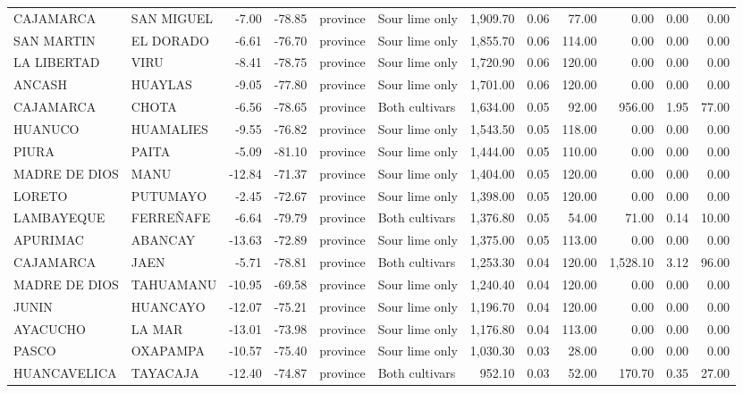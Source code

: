 \begin{longtable}{llrrllrrrrrr}
CAJAMARCA & SAN MIGUEL & -7.00 & -78.85 & province & Sour lime only & 1,909.70 & 0.06 & 77.00 & 0.00 & 0.00 & 0.00 \\
SAN MARTIN & EL DORADO & -6.61 & -76.70 & province & Sour lime only & 1,855.70 & 0.06 & 114.00 & 0.00 & 0.00 & 0.00 \\
LA LIBERTAD & VIRU & -8.41 & -78.75 & province & Sour lime only & 1,720.90 & 0.06 & 120.00 & 0.00 & 0.00 & 0.00 \\
ANCASH & HUAYLAS & -9.05 & -77.80 & province & Sour lime only & 1,701.00 & 0.06 & 120.00 & 0.00 & 0.00 & 0.00 \\
CAJAMARCA & CHOTA & -6.56 & -78.65 & province & Both cultivars & 1,634.00 & 0.05 & 92.00 & 956.00 & 1.95 & 77.00 \\
HUANUCO & HUAMALIES & -9.55 & -76.82 & province & Sour lime only & 1,543.50 & 0.05 & 118.00 & 0.00 & 0.00 & 0.00 \\
PIURA & PAITA & -5.09 & -81.10 & province & Sour lime only & 1,444.00 & 0.05 & 110.00 & 0.00 & 0.00 & 0.00 \\
MADRE DE DIOS & MANU & -12.84 & -71.37 & province & Sour lime only & 1,404.00 & 0.05 & 120.00 & 0.00 & 0.00 & 0.00 \\
LORETO & PUTUMAYO & -2.45 & -72.67 & province & Sour lime only & 1,398.00 & 0.05 & 120.00 & 0.00 & 0.00 & 0.00 \\
LAMBAYEQUE & FERREÑAFE & -6.64 & -79.79 & province & Both cultivars & 1,376.80 & 0.05 & 54.00 & 71.00 & 0.14 & 10.00 \\
APURIMAC & ABANCAY & -13.63 & -72.89 & province & Sour lime only & 1,375.00 & 0.05 & 113.00 & 0.00 & 0.00 & 0.00 \\
CAJAMARCA & JAEN & -5.71 & -78.81 & province & Both cultivars & 1,253.30 & 0.04 & 120.00 & 1,528.10 & 3.12 & 96.00 \\
MADRE DE DIOS & TAHUAMANU & -10.95 & -69.58 & province & Sour lime only & 1,240.40 & 0.04 & 120.00 & 0.00 & 0.00 & 0.00 \\
JUNIN & HUANCAYO & -12.07 & -75.21 & province & Sour lime only & 1,196.70 & 0.04 & 120.00 & 0.00 & 0.00 & 0.00 \\
AYACUCHO & LA MAR & -13.01 & -73.98 & province & Sour lime only & 1,176.80 & 0.04 & 113.00 & 0.00 & 0.00 & 0.00 \\
PASCO & OXAPAMPA & -10.57 & -75.40 & province & Sour lime only & 1,030.30 & 0.03 & 28.00 & 0.00 & 0.00 & 0.00 \\
HUANCAVELICA & TAYACAJA & -12.40 & -74.87 & province & Both cultivars & 952.10 & 0.03 & 52.00 & 170.70 & 0.35 & 27.00 \\

\end{longtable}
